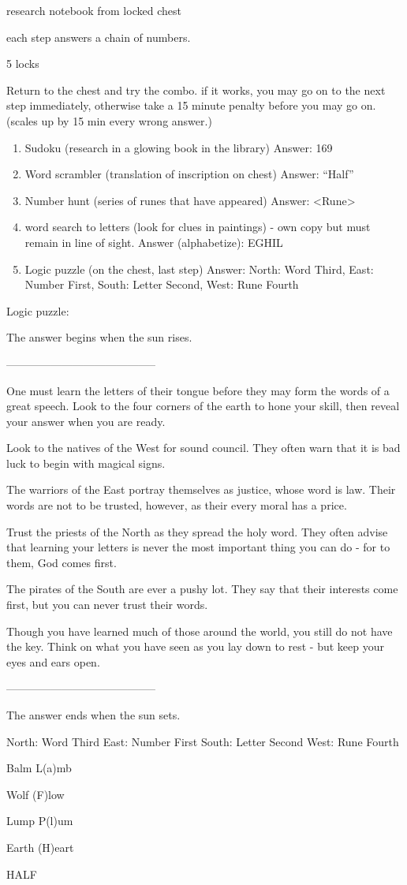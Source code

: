 \documentclass[green]{NeptuneBall}
\begin{document}
\name{\gGlowShell{}}

research notebook from locked chest

each step answers a chain of numbers.

5 locks

Return to the chest and try the combo. if it works, you may go on to the next step immediately, otherwise take a 15 minute penalty before you may go on. (scales up by 15 min every wrong answer.)

\begin{enumerate}
\item Sudoku  (research in a glowing book in the library) Answer: 169
\item Word scrambler  (translation of inscription on chest) Answer: ``Half''
\item Number hunt  (series of runes that have appeared) Answer: <Rune>
\item word search to letters  (look for clues in paintings) - own copy but must remain in line of sight. Answer (alphabetize): EGHIL
\item Logic puzzle  (on the chest, last step) Answer: North: Word Third, East: Number First, South: Letter Second, West: Rune Fourth
\end{enumerate}


Logic puzzle:

The answer begins when the sun rises. 

-----------------------------------------

One must learn the letters of their tongue before they may form the words of a great speech. Look to the four corners of the earth to hone your skill, then reveal your answer when you are ready.

Look to the natives of the West for sound council. They often warn that it is bad luck to begin with magical signs.

The warriors of the East portray themselves as justice, whose word is law. Their words are not to be trusted, however, as their every moral has a price.

Trust the priests of the North as they spread the holy word. They often advise that learning your letters is never the most important thing you can do - for to them, God comes first.

The pirates of the South are ever a pushy lot. They say that their interests come first, but you can never trust their words.

Though you have learned much of those around the world, you still do not have the key. Think on what you have seen as you lay down to rest - but keep your eyes and ears open.

-----------------------------------------

The answer ends when the sun sets.




North: Word Third
East: Number First
South: Letter Second
West: Rune Fourth



Balm
L(a)mb

Wolf
(F)low

Lump
P(l)um

Earth
(H)eart

HALF
\end{document}
